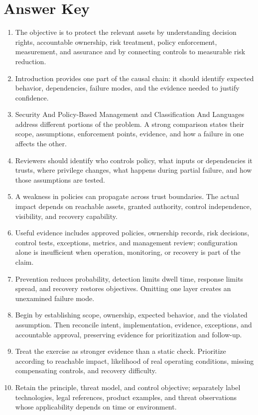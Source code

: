 \documentclass[11pt]{article}
\begin{document}
\section*{Answer Key}
\begin{enumerate}
\item The objective is to protect the relevant assets by understanding decision rights, accountable ownership, risk treatment, policy enforcement, measurement, and assurance and by connecting controls to measurable risk reduction.
\item Introduction provides one part of the causal chain: it should identify expected behavior, dependencies, failure modes, and the evidence needed to justify confidence.
\item Security And Policy-Based Management and Classification And Languages address different portions of the problem. A strong comparison states their scope, assumptions, enforcement points, evidence, and how a failure in one affects the other.
\item Reviewers should identify who controls policy, what inputs or dependencies it trusts, where privilege changes, what happens during partial failure, and how those assumptions are tested.
\item A weakness in policies can propagate across trust boundaries. The actual impact depends on reachable assets, granted authority, control independence, visibility, and recovery capability.
\item Useful evidence includes approved policies, ownership records, risk decisions, control tests, exceptions, metrics, and management review; configuration alone is insufficient when operation, monitoring, or recovery is part of the claim.
\item Prevention reduces probability, detection limits dwell time, response limits spread, and recovery restores objectives. Omitting one layer creates an unexamined failure mode.
\item Begin by establishing scope, ownership, expected behavior, and the violated assumption. Then reconcile intent, implementation, evidence, exceptions, and accountable approval, preserving evidence for prioritization and follow-up.
\item Treat the exercise as stronger evidence than a static check. Prioritize according to reachable impact, likelihood of real operating conditions, missing compensating controls, and recovery difficulty.
\item Retain the principle, threat model, and control objective; separately label technologies, legal references, product examples, and threat observations whose applicability depends on time or environment.
\end{enumerate}
\end{document}
